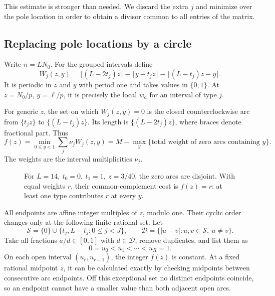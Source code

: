 This estimate is stronger than needed. We discard the extra \(j\)
and minimize over the pole location in order to obtain a divisor
common to all entries of the matrix.

\subsection{Replacing pole locations by a circle}

Write \(n=LN_0\). For the grouped intervals define
\begin{equation}\label{eq:W}
W_j(z,y)=\lfloor(L-2t_j)z\rfloor
-\lfloor y-t_jz\rfloor-\lfloor(L-t_j)z-y\rfloor.
\end{equation}
It is periodic in \(z\) and \(y\) with period one and takes values
in \(\{0,1\}\). At \(z=N_0/p,\ y=\ell/p\), it is precisely the
local \(w_a\) for an interval of type \(j\).

For generic \(z\), the set on which \(W_j(z,y)=0\) is the closed
counterclockwise arc from \(\{t_jz\}\) to \(\{(L-t_j)z\}\).
Its length is \(\{(L-2t_j)z\}\), where braces denote fractional part.
Thus
\begin{equation}\label{eq:f}
f(z)=\min_{0\le y<1}\sum_j\nu_jW_j(z,y)
=M-\max_y\{\text{total weight of zero arcs containing }y\}.
\end{equation}
The weights are the interval multiplicities \(\nu_j\).

\begin{figure}[ht]
\centering
{}
\caption{For \(L=14,\ t_0=0,\ t_1=1,\ z=3/40\), the zero arcs
are disjoint. With equal weights \(r\), their common-complement cost
is \(f(z)=r\): at least one type contributes \(r\) at every \(y\).}
\label{fig:arcs}
\end{figure}

All endpoints are affine integer multiples of \(z\), modulo one.
Their cyclic order changes only at the following finite rational set.
Let
\[
\mathcal S=\{0\}\cup\{t_j,L-t_j:0\le j<J\},\qquad
\mathcal D=\{|u-v|:u,v\in\mathcal S,\ u\ne v\}.
\]
Take all fractions \(a/d\in[0,1]\) with \(d\in\mathcal D\), remove
duplicates, and list them as
\[
0=u_0<u_1<\cdots<u_R=1.
\]
On each open interval \((u_r,u_{r+1})\), the integer \(f(z)\) is
constant. At a fixed rational midpoint \(z\), it can be calculated
exactly by checking midpoints between consecutive arc endpoints.
Off this exceptional set no distinct endpoints coincide, so an
endpoint cannot have a smaller value than both adjacent open arcs.


